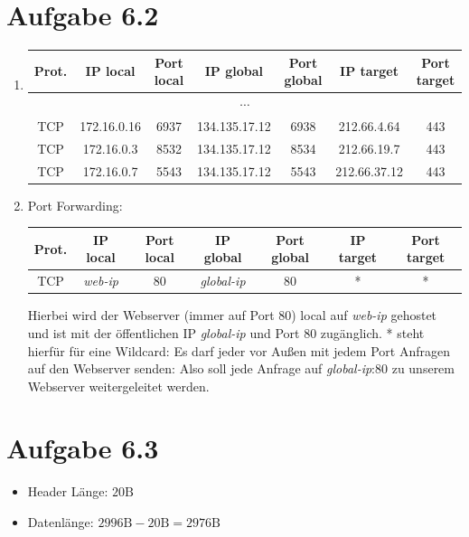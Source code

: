 \documentclass[12pt, a4paper]{article}
\begin{document}
\section*{Aufgabe 6.2}
\begin{enumerate}[label=\alph*)]
	\item	\begin{center}\begin{tabular}{c|c|c|c|c|c|c|}
				Prot. & IP local & Port local & IP global & Port global & IP target & Port target \\
				\hline\hline
				\multicolumn{7}{c}{$\cdots$}\\
				\hline
				TCP & 172.16.0.16 & 6937 & 134.135.17.12 & 6938 & 212.66.4.64 & 443 \\
				TCP & 172.16.0.3 & 8532 & 134.135.17.12 & 8534 & 212.66.19.7 & 443 \\
				TCP & 172.16.0.7 & 5543 & 134.135.17.12 & 5543 & 212.66.37.12 & 443 \\
			\end{tabular}\end{center}
	\item	Port Forwarding:
			\begin{center}\begin{tabular}{c|c|c|c|c|c|c|}
				Prot. & IP local & Port local & IP global & Port global & IP target & Port target \\
				\hline\hline
				TCP & \textit{web-ip} & 80 & \textit{global-ip} & 80 & * & * \\
			\end{tabular}\end{center}
			Hierbei wird der Webserver (immer auf Port 80) local auf \textit{web-ip} gehostet und ist mit der öffentlichen IP \textit{global-ip} und Port 80 zugänglich. * steht hierfür für eine Wildcard: Es darf jeder vor Außen mit jedem Port Anfragen auf den Webserver senden: Also soll jede Anfrage auf \textit{global-ip}:80 zu unserem Webserver weitergeleitet werden.
\end{enumerate}


\newpage


\section*{Aufgabe 6.3}
\begin{itemize}
	\item	Header Länge: $20 \text{B}$
	\item	Datenlänge: $2996 \text{B} - 20 \text{B} = 2976 \text{B}$
\end{itemize}
\end{document}
